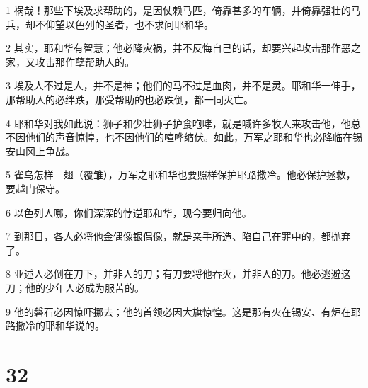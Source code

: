 \par 1 祸哉！那些下埃及求帮助的，是因仗赖马匹，倚靠甚多的车辆，并倚靠强壮的马兵，却不仰望以色列的圣者，也不求问耶和华。
\par 2 其实，耶和华有智慧；他必降灾祸，并不反悔自己的话，却要兴起攻击那作恶之家，又攻击那作孽帮助人的。
\par 3 埃及人不过是人，并不是神；他们的马不过是血肉，并不是灵。耶和华一伸手，那帮助人的必绊跌，那受帮助的也必跌倒，都一同灭亡。
\par 4 耶和华对我如此说：狮子和少壮狮子护食咆哮，就是喊许多牧人来攻击他，他总不因他们的声音惊惶，也不因他们的喧哗缩伏。如此，万军之耶和华也必降临在锡安山冈上争战。
\par 5 雀鸟怎样　翅（覆雏），万军之耶和华也要照样保护耶路撒冷。他必保护拯救，要越门保守。
\par 6 以色列人哪，你们深深的悖逆耶和华，现今要归向他。
\par 7 到那日，各人必将他金偶像银偶像，就是亲手所造、陷自己在罪中的，都抛弃了。
\par 8 亚述人必倒在刀下，并非人的刀；有刀要将他吞灭，并非人的刀。他必逃避这刀；他的少年人必成为服苦的。
\par 9 他的磐石必因惊吓挪去；他的首领必因大旗惊惶。这是那有火在锡安、有炉在耶路撒冷的耶和华说的。

\chapter{32}

